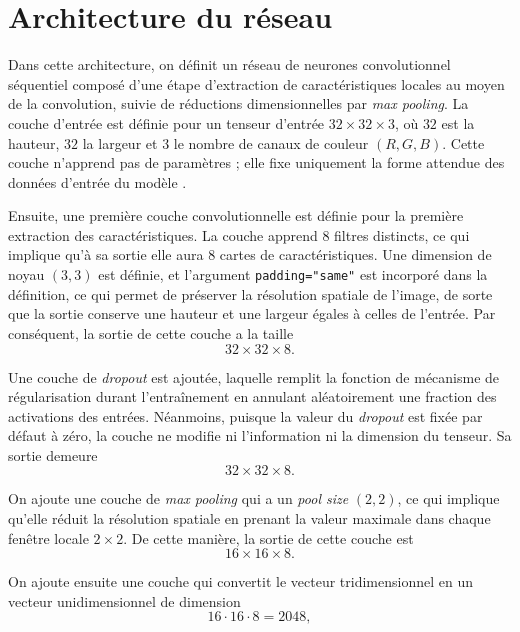 \section{Architecture du réseau}
Dans cette architecture, on définit un réseau de neurones convolutionnel séquentiel composé d’une étape d’extraction de caractéristiques locales au moyen de la convolution, suivie de réductions dimensionnelles par \textit{max pooling}. La couche d’entrée est définie pour un tenseur d’entrée $32\times 32\times 3$,
où $32$ est la hauteur, $32$ la largeur et $3$ le nombre de canaux de couleur $(R,G,B)$. Cette couche n’apprend pas de paramètres ; elle fixe uniquement la forme attendue des données d’entrée du modèle \cite{keras_input_object}.

Ensuite, une première couche convolutionnelle est définie pour la première extraction des caractéristiques. La couche apprend $8$ filtres distincts, ce qui implique qu’à sa sortie elle aura $8$ cartes de caractéristiques. Une dimension de noyau $(3,3)$ est définie, et l’argument \texttt{padding="same"} est incorporé dans la définition, ce qui permet de préserver la résolution spatiale de l’image, de sorte que la sortie conserve une hauteur et une largeur égales à celles de l’entrée. Par conséquent, la sortie de cette couche a la taille
\begin{equation}
32\times 32\times 8.
\end{equation}

Une couche de \textit{dropout} est ajoutée, laquelle remplit la fonction de mécanisme de régularisation durant l’entraînement en annulant aléatoirement une fraction des activations des entrées. Néanmoins, puisque la valeur du \textit{dropout} est fixée par défaut à zéro, la couche ne modifie ni l’information ni la dimension du tenseur. Sa sortie demeure
\begin{equation}
32\times 32\times 8.
\end{equation}

On ajoute une couche de \textit{max pooling} qui a un \textit{pool size} $(2,2)$, ce qui implique qu’elle réduit la résolution spatiale en prenant la valeur maximale dans chaque fenêtre locale $2\times 2$. De cette manière, la sortie de cette couche est
\begin{equation}
16\times 16\times 8.
\end{equation}

On ajoute ensuite une couche qui convertit le vecteur tridimensionnel en un vecteur unidimensionnel de dimension
\begin{equation}
16\cdot 16\cdot 8 = 2048,
\end{equation}

